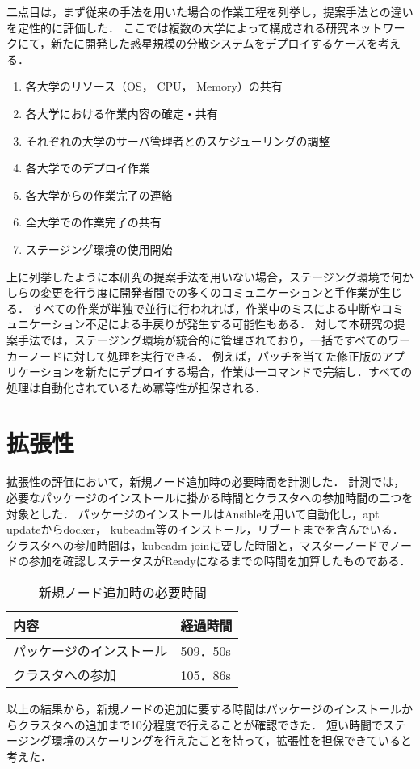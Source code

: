 二点目は，まず従来の手法を用いた場合の作業工程を列挙し，提案手法との違いを定性的に評価した．
ここでは複数の大学によって構成される研究ネットワークにて，新たに開発した惑星規模の分散システムをデプロイするケースを考える．

\begin{enumerate}
  \item 各大学のリソース（OS， CPU， Memory）の共有
  \item 各大学における作業内容の確定・共有
  \item それぞれの大学のサーバ管理者とのスケジューリングの調整
  \item 各大学でのデプロイ作業
  \item 各大学からの作業完了の連絡
  \item 全大学での作業完了の共有
  \item ステージング環境の使用開始
\end{enumerate}

上に列挙したように本研究の提案手法を用いない場合，ステージング環境で何かしらの変更を行う度に開発者間での多くのコミュニケーションと手作業が生じる．
すべての作業が単独で並行に行われれば，作業中のミスによる中断やコミュニケーション不足による手戻りが発生する可能性もある．
対して本研究の提案手法では，ステージング環境が統合的に管理されており，一括ですべてのワーカーノードに対して処理を実行できる．
例えば，パッチを当てた修正版のアプリケーションを新たにデプロイする場合，作業は一コマンドで完結し．すべての処理は自動化されているため冪等性が担保される．

\section{拡張性}
\label{evaluation:method}

拡張性の評価において，新規ノード追加時の必要時間を計測した．
計測では，必要なパッケージのインストールに掛かる時間とクラスタへの参加時間の二つを対象とした．
パッケージのインストールはAnsibleを用いて自動化し，apt updateからdocker， kubeadm等のインストール，リブートまでを含んでいる．
クラスタへの参加時間は，kubeadm joinに要した時間と，マスターノードでノードの参加を確認しステータスがReadyになるまでの時間を加算したものである．

\begin{table}[htb]
  \begin{center}
    \caption{新規ノード追加時の必要時間}
    \begin{tabular}{|l|l|} \hline
      内容 & 経過時間 \\ \hline
      パッケージのインストール & 509．50s \\ \hline
      クラスタへの参加 & 105．86s \\ \hline
    \end{tabular}
  \end{center}
\end{table}

以上の結果から，新規ノードの追加に要する時間はパッケージのインストールからクラスタへの追加まで10分程度で行えることが確認できた．
短い時間でステージング環境のスケーリングを行えたことを持って，拡張性を担保できていると考えた．

